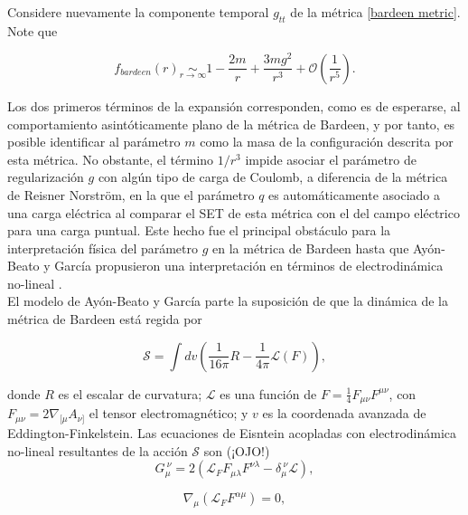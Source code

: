 \documentclass{article}
\numberwithin{equation}{section}
\theoremstyle{definition}
\begin{document}
Considere nuevamente la componente temporal $g_{tt}$ de la métrica \eqref{bardeen metric}. Note que

\begin{equation}
f_{bardeen}(r) \underset{r \to \infty}{\sim} 1 - \frac{2m}{r} + \frac{3mg^2}{r^3} + \mathcal{O}\left( \frac{1}{r^5} \right).
\end{equation}

Los dos primeros términos de la expansión corresponden, como es de esperarse, al comportamiento asintóticamente plano de la métrica de Bardeen, y por tanto, es posible identificar al parámetro $m$ como la masa de la configuración descrita por esta métrica. No obstante, el término $1/r^3$ impide asociar el parámetro  de regularización $g$ con algún tipo de carga de Coulomb, a diferencia de la métrica de Reisner Norström, en la que el parámetro $q$ es automáticamente asociado a una carga eléctrica al comparar el SET de esta métrica con el del campo eléctrico para una carga puntual. Este hecho fue el principal obstáculo para la interpretación física del parámetro $g$ en la métrica de Bardeen hasta que Ayón-Beato y García propusieron una interpretación en términos de electrodinámica no-lineal \cite{ayon-beato2000}.\\

El modelo de Ayón-Beato y García parte la suposición de que la dinámica de la métrica de Bardeen está regida por

\begin{equation}
\mathcal{S} = \int dv \left( \frac{1}{16 \pi}R - \frac{1}{4 \pi}\mathcal{L}(F) \right),
\end{equation}

donde $R$ es el escalar de curvatura; $\mathcal{L}$ es una función de $F = \frac{1}{4}F_{\mu \nu}F^{\mu \nu}$, con $F_{\mu \nu} = 2\nabla_{[\mu}A_{\nu]}$ el tensor electromagnético; y $v$ es la coordenada avanzada de Eddington-Finkelstein. Las ecuaciones de Eisntein acopladas con electrodinámica no-lineal resultantes de la acción $\mathcal{S}$ son (¡OJO!)\\

\begin{equation}
\label{euler lagrange eqns 1}
G_{\mu}^{\ \nu} = 2(\mathcal{L}_{F} F_{\mu \lambda} F^{\nu \lambda} - \delta_{\mu}^{\ \nu} \mathcal{L}),
\end{equation}

\begin{equation}
\label{euler lagrange eqns 2}
\nabla_{\mu}(\mathcal{L}_{F} F^{\alpha \mu}) = 0,
\end{equation}
\end{document}
